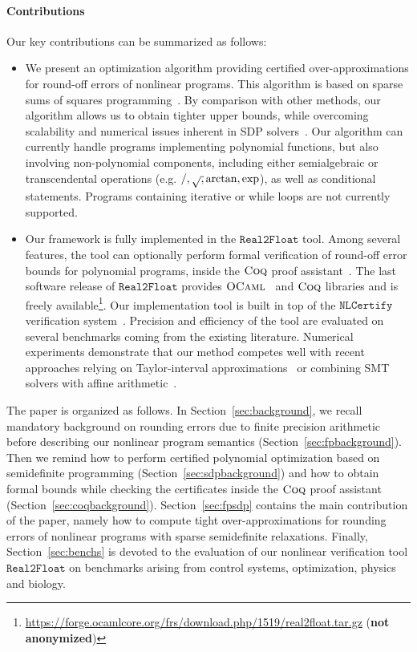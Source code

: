 \documentclass[preprint]{sigplanconf}
\newcommand{\realtofloat}{\mathtt{Real2Float}}
\newcommand{\coq}{\text{\sc Coq}}
\newcommand{\ocaml}{\text{\sc OCaml}}
\newcommand{\nlcertify}{\mathtt{NLCertify}}
\theoremstyle{plain}
\begin{document}
\paragraph{Contributions}
%
Our key contributions can be summarized as follows:
\begin{itemize}
\item We present an optimization algorithm providing certified over-approximations for round-off errors of nonlinear programs. This algorithm is based on sparse sums of squares programming~\cite{Las06SparseSOS}. By comparison with other methods, our algorithm allows us to obtain tighter upper bounds, while overcoming scalability and numerical issues inherent in SDP solvers~\cite{Todd01semidefiniteoptimization}. Our algorithm can currently handle  programs implementing polynomial functions, but also involving non-polynomial components, including either semialgebraic or transcendental operations (e.g. $/, \sqrtsign, \arctan, \exp$), as well as conditional statements.  Programs containing iterative or while loops are not currently supported.
\item Our framework is fully implemented in the $\realtofloat$ tool.  Among several features, the tool can optionally perform formal verification of round-off error bounds for polynomial programs, inside the $\coq$ proof assistant~\cite{CoqProofAssistant}. The last software release of $\realtofloat$ provides $\ocaml$~\cite{OCaml} and $\coq$ libraries and is freely available\footnote{\url{https://forge.ocamlcore.org/frs/download.php/1519/real2float.tar.gz} (\textbf{not anonymized})}.
%
%
Our implementation tool is built in top of the $\nlcertify$ verification system~\cite{icms14}. Precision and efficiency of the tool are evaluated on several benchmarks coming from the existing literature. Numerical experiments demonstrate that our method competes well with recent approaches relying on Taylor-interval approximations~\cite{fptaylor15} or combining SMT solvers with affine arithmetic~\cite{Darulova14Popl}.
\end{itemize}
%


The paper is organized as follows.
%
In Section~\ref{sec:background}, we recall mandatory background on rounding errors due to finite precision arithmetic before describing our nonlinear program semantics (Section~\ref{sec:fpbackground}). Then we remind how to perform certified polynomial optimization based on semidefinite programming (Section~\ref{sec:sdpbackground}) and how to obtain formal bounds while checking the certificates inside the $\coq$ proof assistant (Section~\ref{sec:coqbackground}).
%
Section~\ref{sec:fpsdp} contains the main contribution of the paper, namely how to compute tight over-approximations for rounding errors of nonlinear programs with sparse semidefinite relaxations.
%
Finally, Section~\ref{sec:benchs} is devoted to the evaluation of our nonlinear verification tool $\realtofloat$ on benchmarks arising from control systems, optimization, physics and biology.
\end{document}
